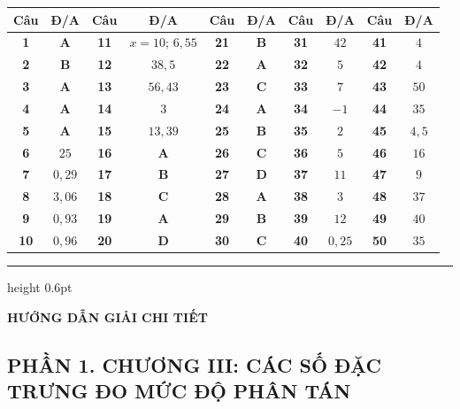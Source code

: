 \documentclass[12pt,a4paper]{article}
\begin{document}
\begin{center}
\renewcommand{\arraystretch}{1.2}
\begin{tabular}{|c|c||c|c||c|c||c|c||c|c|}
\hline
\textbf{Câu} & \textbf{Đ/A} & \textbf{Câu} & \textbf{Đ/A} & \textbf{Câu} & \textbf{Đ/A} & \textbf{Câu} & \textbf{Đ/A} & \textbf{Câu} & \textbf{Đ/A} \\ \hline
\textbf{1} & \textbf{A} & \textbf{11} & $x=10$; $6{,}55$ & \textbf{21} & \textbf{B} & \textbf{31} & $42$ & \textbf{41} & $4$ \\ \hline
\textbf{2} & \textbf{B} & \textbf{12} & $38{,}5$ & \textbf{22} & \textbf{A} & \textbf{32} & $5$ & \textbf{42} & $4$ \\ \hline
\textbf{3} & \textbf{A} & \textbf{13} & $56{,}43$ & \textbf{23} & \textbf{C} & \textbf{33} & $7$ & \textbf{43} & $50$ \\ \hline
\textbf{4} & \textbf{A} & \textbf{14} & $3$ & \textbf{24} & \textbf{A} & \textbf{34} & $-1$ & \textbf{44} & $35$ \\ \hline
\textbf{5} & \textbf{A} & \textbf{15} & $13{,}39$ & \textbf{25} & \textbf{B} & \textbf{35} & $2$ & \textbf{45} & $4{,}5$ \\ \hline
\textbf{6} & $25$ & \textbf{16} & \textbf{A} & \textbf{26} & \textbf{C} & \textbf{36} & $5$ & \textbf{46} & $16$ \\ \hline
\textbf{7} & $0{,}29$ & \textbf{17} & \textbf{B} & \textbf{27} & \textbf{D} & \textbf{37} & $11$ & \textbf{47} & $9$ \\ \hline
\textbf{8} & $3{,}06$ & \textbf{18} & \textbf{C} & \textbf{28} & \textbf{A} & \textbf{38} & $3$ & \textbf{48} & $37$ \\ \hline
\textbf{9} & $0{,}93$ & \textbf{19} & \textbf{A} & \textbf{29} & \textbf{B} & \textbf{39} & $12$ & \textbf{49} & $40$ \\ \hline
\textbf{10} & $0{,}96$ & \textbf{20} & \textbf{D} & \textbf{30} & \textbf{C} & \textbf{40} & $0{,}25$ & \textbf{50} & $35$ \\ \hline
\end{tabular}
\end{center}

\vspace{10pt}
\hrule height 0.6pt
\vspace{10pt}

\begin{center}
    {\fontsize{13}{15}\selectfont\textbf{HƯỚNG DẪN GIẢI CHI TIẾT}}
\end{center}

\subsection*{PHẦN 1. CHƯƠNG III: CÁC SỐ ĐẶC TRƯNG ĐO MỨC ĐỘ PHÂN TÁN}
\end{document}
